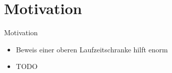 \documentclass{beamer}
\begin{document}
    \section{Motivation}
    \begin{frame}{Motivation}
        \begin{itemize}
            \item Beweis einer oberen Laufzeitschranke hilft enorm
            \vfill
            \item TODO
        \end{itemize}
    \end{frame}
\end{document}
